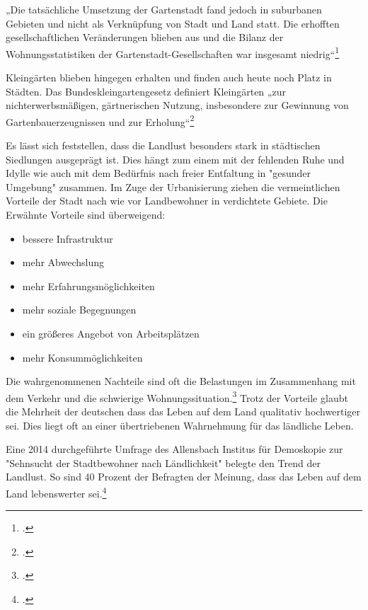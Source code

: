\documentclass{scrartcl}
\begin{document}
\begin{displayquote}
„Die tatsächliche Umsetzung der Gartenstadt fand jedoch in suburbanen Gebieten und nicht als Verknüpfung von Stadt und Land statt. Die erhofften gesellschaftlichen Veränderungen blieben aus und die Bilanz der Wohnungsstatistiken der Gartenstadt-Gesellschaften war insgesamt niedrig“\footcite[S. 36]{Egnolff2015DieIdeal} 
\end{displayquote}

Kleingärten blieben hingegen erhalten und finden auch heute noch Platz in Städten. Das Bundeskleingartengesetz definiert Kleingärten „zur nichterwerbsmäßigen, gärtnerischen Nutzung, insbesondere zur Gewinnung von Gartenbauerzeugnissen und zur Erholung“\footcite[§ 1]{Verbraucherschutz2006BundeskleingartengesetzBKleingG}

Es lässt sich feststellen, dass die Landlust besonders stark in städtischen Siedlungen ausgeprägt ist. Dies hängt zum einem mit der fehlenden Ruhe und Idylle wie auch mit dem Bedürfnis nach freier Entfaltung in "gesunder Umgebung" zusammen. Im Zuge der Urbanisierung ziehen die vermeintlichen Vorteile der Stadt nach wie vor Landbewohner in verdichtete Gebiete. Die Erwähnte Vorteile sind überweigend: 

\begin{itemize}
\item bessere Infrastruktur
\item mehr Abwechslung
\item mehr Erfahrungsmöglichkeiten 
\item mehr soziale Begegnungen
\item ein größeres Angebot von Arbeitsplätzen
\item mehr Konsummöglichkeiten
\end{itemize}

Die wahrgenommenen Nachteile sind oft die Belastungen im Zusammenhang mit dem Verkehr und die schwierige Wohnungssituation.\footcite[S. 41]{Egnolff2015DieIdeal} Trotz der Vorteile glaubt die Mehrheit der deutschen dass das Leben auf dem Land qualitativ hochwertiger sei. Dies liegt oft an einer übertriebenen Wahrnehmung für das ländliche Leben.

Eine 2014 durchgeführte Umfrage des Allensbach Institus für Demoskopie zur "Sehnsucht der Stadtbewohner nach Ländlichkeit" belegte den Trend der Landlust. So sind 40 Prozent der Befragten der Meinung, dass das Leben auf dem Land lebenswerter sei.\footcite[Vgl.][S. 15 Abb.2]{Dr.ThomasPetersen2014DieLandlichkeit}
\end{document}
